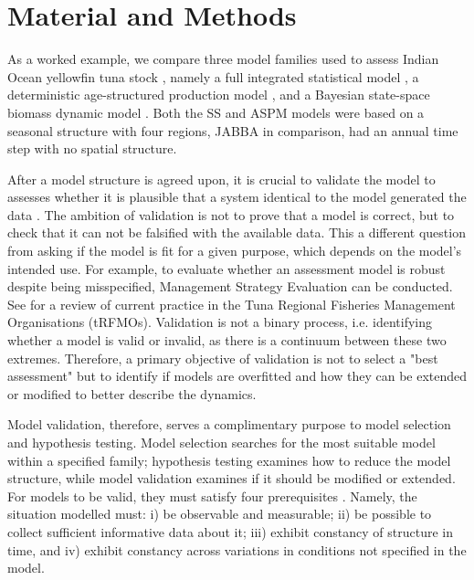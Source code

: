 \documentclass[11pt,a4paper]{article}
\begin{document}
{\section{Material and Methods}

 As a worked example, we compare three model families used to assess Indian Ocean yellowfin tuna stock \citep{IOTWPTT21}, namely a full integrated statistical model \citep[SS,][]{methot2013stock}, a deterministic age-structured production model \citep[ASPM,][]{maunder2015contemporary}, and a Bayesian state-space biomass dynamic model \citep[JABBA,][]{winker2018jabba}. Both the SS and ASPM models were based on a seasonal structure with four regions, JABBA in comparison, had an annual time step with no spatial structure. 
 

After a model structure is agreed upon, it is crucial to validate the model to assesses whether it is plausible that a system identical to the model generated the data \citep{thygesen2017validation}. The ambition of validation is not to prove that a model is correct, but to check that it can not be falsified with the available data. This a different question from asking if the model is fit for a given purpose, which depends on the model's intended use. For example, to evaluate whether an assessment model is robust despite being misspecified, Management Strategy Evaluation \citep[MSE,][]{punt2007developing} can be conducted. See \cite{sharma2020trfmo} for a review of current practice in the Tuna Regional Fisheries Management Organisations (tRFMOs). Validation is not a binary process, i.e. identifying whether a model is valid or invalid, as there is a continuum between these two extremes. Therefore, a primary objective of validation is not to select a "best assessment" but to identify if models are overfitted and how they can be extended or modified to better describe the dynamics.

Model validation, therefore, serves a complimentary purpose to model selection and hypothesis testing. Model selection searches for the most suitable model within a specified family; hypothesis testing examines how to reduce the model structure, while model validation examines if it should be modified or extended. For models to be valid, they must satisfy four prerequisites \citep{hodges1992you}. Namely, the situation modelled must: i) be observable and measurable; ii) be possible to collect sufficient informative data about it; iii) exhibit constancy of structure in time, and iv) exhibit constancy across variations in conditions not specified in the model.

}
\end{document}
